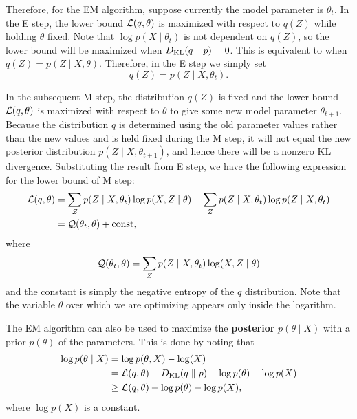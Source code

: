 \documentclass[a4paper]{article}
\begin{document}
Therefore, for the EM algorithm, suppose currently the model
parameter is $\theta_t$. In the E step, the lower bound
$\mathcal{L}(q, \theta)$ is maximized with respect to $q(Z)$ while
holding $\theta$ fixed. Note that $\log p(X \mid \theta_t)$
is not dependent on $q(Z)$, so the lower bound will
be maximized when $D_{\text{KL}}(q \; \Vert \; p) = 0$. This is equivalent to
when $q(Z) = p(Z \mid X, \theta)$. Therefore, in the E
step we simply set
\[
q(Z) = p(Z \mid X, \theta_t).
\]

In the subsequent M step, the distribution $q(Z)$ is fixed
and the lower bound $\mathcal{L}(q, \theta)$ is maximized with
respect to $\theta$ to give some new model parameter
$\theta_{t + 1}$. Because the distribution $q$ is determined
using the old parameter values rather than the new values
and is held fixed during the M step, it will not equal the
new posterior distribution $p(Z \mid X, \theta_{t+1})$,
and hence there will be a nonzero KL divergence.
Substituting the result from E step, we have the following
expression for the lower bound of M step:
\[
\begin{aligned}
  \mathcal{L}(q, \theta)
  &= \sum_Z p(Z \mid X, \theta_t) \log p(X, Z \mid \theta)
  - \sum_Z p(Z \mid X, \theta_t) \log p(Z \mid X, \theta_t) \\
  &= \mathcal{Q}(\theta_t, \theta) + \mathrm{const},
\end{aligned}
\]
where
\[
\mathcal{Q}(\theta_t, \theta) = \sum_Z p(Z \mid X, \theta_t)
\log (X, Z \mid \theta)
\]
and the constant is simply the negative entropy of
the $q$ distribution. Note that the variable $\theta$
over which we are optimizing appears only inside the
logarithm.

The EM algorithm can also be used to maximize the
\textbf{posterior}
$p(\theta \mid X)$ with a prior $p(\theta)$
of the parameters. This is done by noting that
\[
\begin{aligned}
\log p(\theta \mid X)
&= \log p(\theta, X) - \log (X) \\
&= \mathcal{L}(q, \theta) + D_{\text{KL}}(q \; \Vert \; p) + \log p(\theta) - \log p(X) \\
&\geq \mathcal{L}(q, \theta) + \log p(\theta) - \log p(X),
\end{aligned}
\]
where $\log p(X)$ is a constant.
\end{document}
